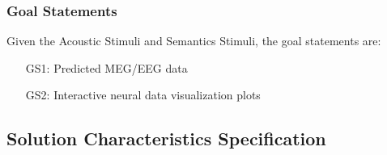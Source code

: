 \documentclass[12pt]{article}
\begin{document}
\subsubsection{Goal Statements}


\noindent Given the Acoustic Stimuli and Semantics Stimuli, the goal statements are:

\begin{itemize}

\item[GS1:] Predicted MEG/EEG data
\item[GS2:] Interactive neural data visualization plots

\end{itemize}

\subsection{Solution Characteristics Specification}
\end{document}

